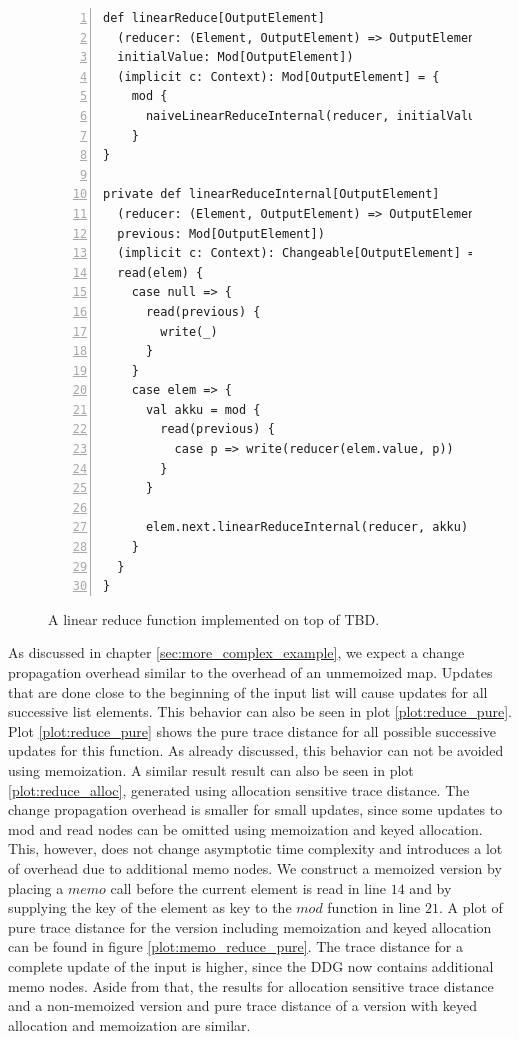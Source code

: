 \begin{figure}
\begin{lstlisting}[frame=single,basicstyle=\ttfamily,numbers=left,mathescape=true]
def linearReduce[OutputElement]
  (reducer: (Element, OutputElement) => OutputElement, 
  initialValue: Mod[OutputElement])
  (implicit c: Context): Mod[OutputElement] = {
    mod {
      naiveLinearReduceInternal(reducer, initialValue)
    }
}

private def linearReduceInternal[OutputElement]
  (reducer: (Element, OutputElement) => OutputElement, 
  previous: Mod[OutputElement])
  (implicit c: Context): Changeable[OutputElement] = {
  read(elem) {
    case null => {
      read(previous) {
        write(_)
      }
    }
    case elem => {
      val akku = mod {
        read(previous) {
          case p => write(reducer(elem.value, p))
        }
      }

      elem.next.linearReduceInternal(reducer, akku)
    }
  }
}
\end{lstlisting}
\caption{A linear reduce function implemented on top of TBD.}
\label{code:linear_reduce}
\end{figure}

As discussed in chapter \ref{sec:more_complex_example}, we expect a change propagation overhead similar to the overhead of an unmemoized map. Updates that are done close to the beginning of the input list will cause updates for all successive list elements. This behavior can also be seen in plot \ref{plot:reduce_pure}. Plot \ref{plot:reduce_pure} shows the pure trace distance for all possible successive updates for this function. As already discussed, this behavior can not be avoided using memoization. A similar result result can also be seen in plot \ref{plot:reduce_alloc}, generated using allocation sensitive trace distance. The change propagation overhead is smaller for small updates, since some updates to mod and read nodes can be omitted using memoization and keyed allocation. This, however, does not change asymptotic time complexity and introduces a lot of overhead due to additional memo nodes. We construct a memoized version by placing a $memo$ call before the current element is read in line $14$ and by supplying the key of the element as key to the $mod$ function in line $21$. A plot of pure trace distance for the version including memoization and keyed allocation can be found in figure \ref{plot:memo_reduce_pure}. The trace distance for a complete update of the input is higher, since the DDG now contains additional memo nodes. Aside from that, the results for allocation sensitive trace distance and a non-memoized version and pure trace distance of a version with keyed allocation and memoization are similar. 

